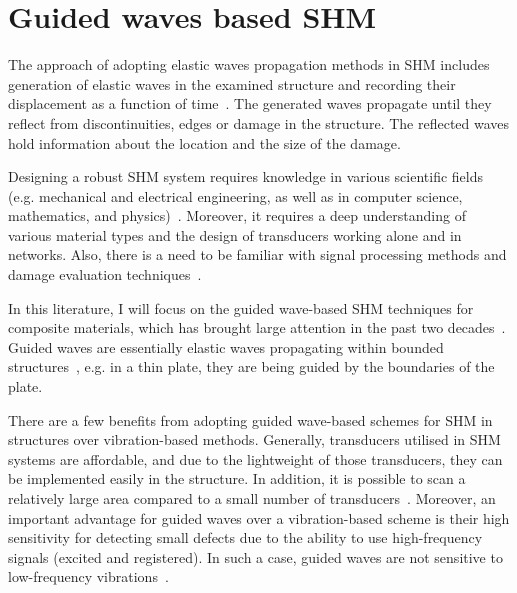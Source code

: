\section[Guided waves based SHM]{Guided waves based SHM}
\label{sec22}
The approach of adopting elastic waves propagation methods in SHM includes generation of elastic waves in the examined structure and recording their displacement as a function of time~\cite{Ostachowicz2012}. 
The generated waves propagate until they reflect from discontinuit\-ies, edges or damage in the structure. The reflected waves hold information about the location and the size of the damage.  

Designing a robust SHM system requires knowledge in various scientific fields (e.g. mechanical and electrical engineering, as well as in computer science, mathematics, and physics)~\cite{Willberg2013}.
Moreover, it requires a deep understanding of various material types and the design of transducers working alone and in networks. 
Also, there is a need to be familiar with signal processing methods and damage evaluation techniques~\cite{Willberg2013}.

In this literature, I will focus on the guided wave-based SHM techniques for composite materials, which has brought large attention in the past two decades~\cite{Mitra2016}.
Guided waves are essentially elastic waves propagating within bounded 
structures~\cite{Mitra2016}, e.g. in a thin plate, they are being guided by the boundaries of the plate. 

There are a few benefits from adopting guided wave-based schemes for SHM in structures over vibration-based methods. 
Generally, transducers utilised in SHM systems are affordable, and due to the lightweight of those transducers, they can be implemented easily in the structure.
In addition, it is possible to scan a relatively large area compared to a small number of transducers~\cite{Mitra2016}. 
Moreover, an important advantage for guided waves over a vibration-based scheme is their high sensitivity for detecting small defects due to the ability to use high-frequency signals (excited and registered).
In such a case, guided waves are not sensitive to low-frequency vibrations~\cite{Mitra2016,Croxford2007}.

